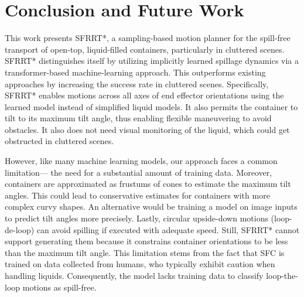 \section{Conclusion and Future Work}\label{sec:conclusion}
This work presents SFRRT*, a sampling-based motion planner for the spill-free transport of open-top, liquid-filled containers, particularly in cluttered scenes. SFRRT* distinguishes itself by utilizing implicitly learned spillage dynamics via a transformer-based machine-learning approach. This outperforms existing approaches by increasing the success rate in cluttered scenes. Specifically, SFRRT* enables motions across all axes of end effector orientations using the learned model instead of simplified liquid models. It also permits the container to tilt to its maximum tilt angle, thus enabling flexible maneuvering to avoid obstacles. It also does not need visual monitoring of the liquid, which could get obstructed in cluttered scenes. 


However, like many machine learning models, our approach faces a common limitation— the need for a substantial amount of training data. Moreover, containers are approximated as frustums of cones to estimate the maximum tilt angles. This could lead to conservative estimates for containers with more complex curvy shapes. An alternative would be training a model on image inputs to predict tilt angles more precisely. Lastly, circular upside-down motions (loop-de-loop) can avoid spilling if executed with adequate speed. Still, SFRRT* cannot support generating them because it constrains container orientations to be less than the maximum tilt angle. This limitation stems from the fact that SFC is trained on data collected from humans, who typically exhibit caution when handling liquids. Consequently, the model lacks training data to classify loop-the-loop motions as spill-free.


